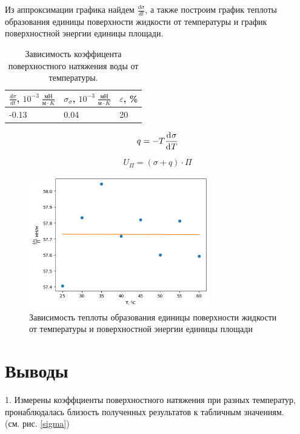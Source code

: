 \documentclass[a4paper,12pt]{article}
\begin{document}
Из аппроксимации графика найдем $\frac{d\sigma}{dt}$, а также построим график теплоты образования единицы поверхности жидкости от температуры и график поверхностной энергии единицы площади.

\begin{table}[H]
    \centering
    \begin{tabular}{|l|l|l|}
        \hline
        $\frac{d\sigma}{dt}$, $10^{-3}\;   \frac{\text{мН}}{\text{м} \cdot K}$ & $\sigma_\sigma$, $10^{-3}\; \frac{\text{мН}}{\text{м} \cdot K}$ & $\varepsilon$, \% \\ \hline
        -0.13                                                                  & 0.04                                                            & 20                \\ \hline
    \end{tabular}
    \caption{Зависимость коэффицента поверхностного натяжения воды от температуры.\label{dsigma}}
\end{table}


\begin{equation}
    q = -T \deriv{\sigma}{T}
\end{equation}

\begin{equation}
    U_\Pi = (\sigma + q) \cdot \Pi
\end{equation}

\begin{figure}[H]
    \begin{center}
        \includegraphics[width=0.7\textwidth]{data/U.png}
    \end{center}
    \caption{Зависимость теплоты образования единицы поверхности жидкости от температуры и поверхностной энергии единицы площади} \label{ass}
\end{figure}

\section{Выводы}
\hspace{5mm}
1. Измерены коэффциенты поверхностного натяжения при разных температур, пронаблюдалась близость полученных результатов к табличным значениям.\\
(см. рис. \ref{sigma})
\end{document}
